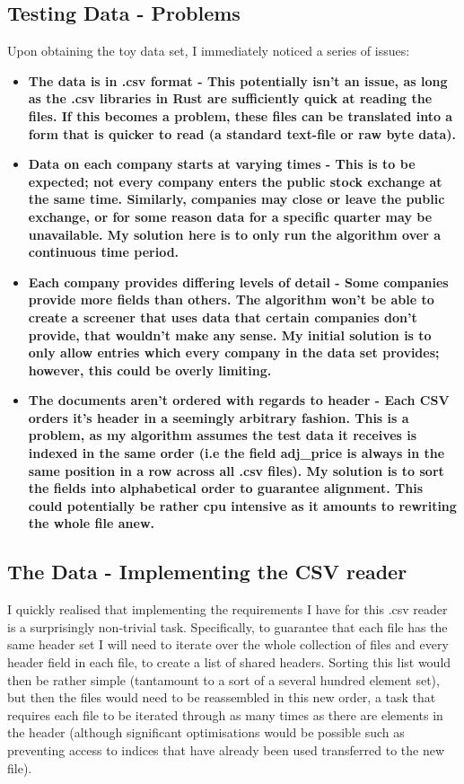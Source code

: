 \subsection{Testing Data - Problems}
Upon obtaining the toy data set, I immediately noticed a series of issues:
\begin{itemize}
    \item \bf The data is in .csv format \rm - This potentially isn't an issue, as long as the .csv libraries in Rust are sufficiently quick at reading the files. If this becomes a problem, these files can be translated into a form that is quicker to read (a standard text-file or raw byte data).
    \item \bf Data on each company starts at varying times \rm - This is to be expected; not every company enters the public stock exchange at the same time. Similarly, companies may close or leave the public exchange, or for some reason data for a specific quarter may be unavailable. My solution here is to only run the algorithm over a continuous time period.
    \item \bf Each company provides differing levels of detail \rm - Some companies provide more fields than others. The algorithm won't be able to create a screener that uses data that certain companies don't provide, that wouldn't make any sense. My initial solution is to only allow entries which every company in the data set provides; however, this could be overly limiting.
    \item \bf The documents aren't ordered with regards to header \rm - Each CSV orders it's header in a seemingly arbitrary fashion. This is a problem, as my algorithm assumes the test data it receives is indexed in the same order (i.e the field adj\_price is always in the same position in a row across all .csv files). My solution is to sort the fields into alphabetical order to guarantee alignment. This could potentially be rather cpu intensive as it amounts to rewriting the whole file anew.
\end{itemize}

\subsection{The Data - Implementing the CSV reader} \label{DataCSVRead}
I quickly realised that implementing the requirements I have for this .csv reader is a surprisingly non-trivial task. Specifically, to guarantee that each file has the same header set I will need to iterate over the whole collection of files and every header field in each file, to create a list of shared headers. Sorting this list would then be rather simple (tantamount to a sort of a several hundred element set), but then the files would need to be reassembled in this new order, a task that requires each file to be iterated through as many times as there are elements in the header (although significant optimisations would be possible such as preventing access to indices that have already been used transferred to the new file). \newline

